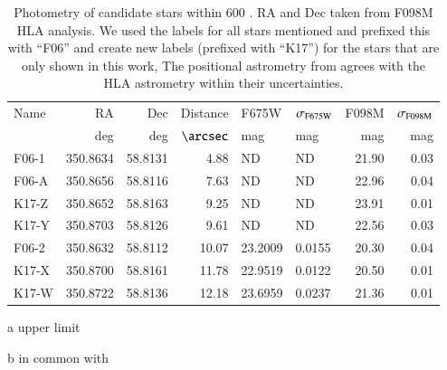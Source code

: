\begin{table*}
\begin{threeparttable}
\begin{tabular}{lrrrllrr}
\toprule
 Name &     RA &     Dec & Distance &        F675W & $\sigma_{\rm F675W}$ & F098M & $\sigma_{\rm F098M}$ \\
          &    deg      &    deg      &     $\arcsec$   &mag      &       mag               &   mag    &   mag                    \\
\midrule
F06-1 & 350.8634 & 58.8131 &     4.88 &  ND\tnote{a} &          ND\tnote{a} & 21.90 &                 0.03 \\
F06-A & 350.8656 & 58.8116 &     7.63 &  ND\tnote{a} &          ND\tnote{a} & 22.96 &                 0.04 \\
K17-Z & 350.8652 & 58.8163 &     9.25 &  ND\tnote{a} &          ND\tnote{a} & 23.91 &                 0.01 \\
K17-Y & 350.8703 & 58.8126 &     9.61 &  ND\tnote{a} &          ND\tnote{a} & 22.56 &                 0.03 \\
F06-2 & 350.8632 & 58.8112 &    10.07 &      23.2009 &               0.0155 & 20.30 &                 0.04 \\
K17-X\tnote{b} & 350.8700 & 58.8161 &    11.78 &      22.9519 &               0.0122 & 20.50 &                 0.01 \\
K17-W & 350.8722 & 58.8136 &    12.18 &      23.6959 &               0.0237 & 21.36 &                 0.01 \\
\bottomrule
\end{tabular}
\begin{tablenotes}
\item[a] upper limit
\item [b] in common with \citet{2018MNRAS.473.1633K}
 \end{tablenotes}
\end{threeparttable}
\caption{Photometry of candidate stars within 600 \kms. RA and Dec taken from F098M HLA analysis. We used the labels for all stars mentioned \citet{2006ApJ...636..848F} and prefixed this with ``F06'' and create new labels (prefixed with ``K17'') for the stars that are only shown in this work, The positional astrometry from \citet{2006ApJ...636..848F} agrees with the HLA astrometry within their uncertainties.}
\label{tab:photometry}
\end{table*}
